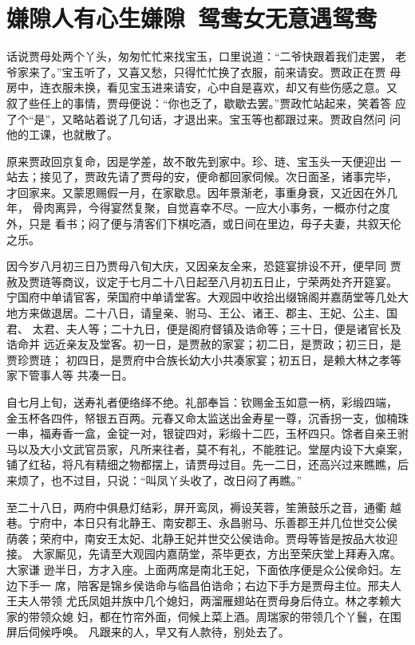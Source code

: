 \chapter{嫌隙人有心生嫌隙~鸳鸯女无意遇鸳鸯}

话说贾母处两个丫头，匆匆忙忙来找宝玉，口里说道：“二爷快跟着我们走罢，
老爷家来了。”宝玉听了，又喜又愁，只得忙忙换了衣服，前来请安。贾政正在贾
母房中，连衣服未换，看见宝玉进来请安，心中自是喜欢，却又有些伤感之意。又
叙了些任上的事情，贾母便说：“你也乏了，歇歇去罢。”贾政忙站起来，笑着答
应了个“是”，又略站着说了几句话，才退出来。宝玉等也都跟过来。贾政自然问
问他的工课，也就散了。

原来贾政回京复命，因是学差，故不敢先到家中。珍、琏、宝玉头一天便迎出
一站去；接见了，贾政先请了贾母的安，便命都回家伺候。次日面圣，诸事完毕，
才回家来。又蒙恩赐假一月，在家歇息。因年景渐老，事重身衰，又近因在外几年，
骨肉离异，今得宴然复聚，自觉喜幸不尽。一应大小事务，一概亦付之度外，只是
看书；闷了便与清客们下棋吃酒，或日间在里边，母子夫妻，共叙天伦之乐。

因今岁八月初三日乃贾母八旬大庆，又因亲友全来，恐筵宴排设不开，便早同
贾赦及贾琏等商议，议定于七月二十八日起至八月初五日止，宁荣两处齐开筵宴。
宁国府中单请官客，荣国府中单请堂客。大观园中收拾出缀锦阁并嘉荫堂等几处大
地方来做退居。二十八日，请皇亲、驸马、王公、诸王、郡主、王妃、公主、国君、
太君、夫人等；二十九日，便是阁府督镇及诰命等；三十日，便是诸官长及诰命并
远近亲友及堂客。初一日，是贾赦的家宴；初二日，是贾政；初三日，是贾珍贾琏；
初四日，是贾府中合族长幼大小共凑家宴；初五日，是赖大林之孝等家下管事人等
共凑一日。

自七月上旬，送寿礼者便络绎不绝。礼部奉旨：钦赐金玉如意一柄，彩缎四端，
金玉杯各四件，帑银五百两。元春又命太监送出金寿星一尊，沉香拐一支，伽楠珠
一串，福寿香一盒，金锭一对，银锭四对，彩缎十二匹，玉杯四只。馀者自亲王驸
马以及大小文武官员家，凡所来往者，莫不有礼，不能胜记。堂屋内设下大桌案，
铺了红毡，将凡有精细之物都摆上，请贾母过目。先一二日，还高兴过来瞧瞧，后
来烦了，也不过目，只说：“叫凤丫头收了，改日闷了再瞧。”

至二十八日，两府中俱悬灯结彩，屏开鸾凤，褥设芙蓉，笙箫鼓乐之音，通衢
越巷。宁府中，本日只有北静王、南安郡王、永昌驸马、乐善郡王并几位世交公侯
荫袭；荣府中，南安王太妃、北静王妃并世交公侯诰命。贾母等皆是按品大妆迎接。
大家厮见，先请至大观园内嘉荫堂，茶毕更衣，方出至荣庆堂上拜寿入席。大家谦
逊半日，方才入座。上面两席是南北王妃，下面依序便是众公侯命妇。左边下手一
席，陪客是锦乡侯诰命与临昌伯诰命；右边下手方是贾母主位。邢夫人王夫人带领
尤氏凤姐并族中几个媳妇，两溜雁翅站在贾母身后侍立。林之孝赖大家的带领众媳
妇，都在竹帘外面，伺候上菜上酒。周瑞家的带领几个丫鬟，在围屏后伺候呼唤。
凡跟来的人，早又有人款待，别处去了。

